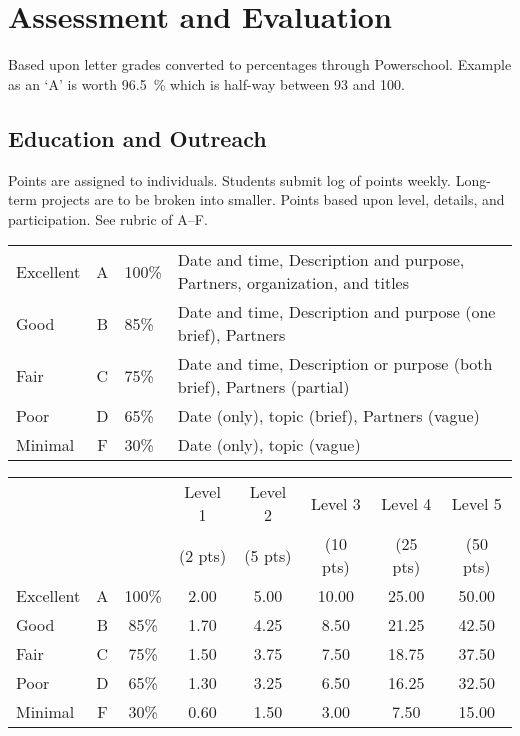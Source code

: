 \documentclass[letterpaper,10pt]{memoir}
\begin{document}
\newpage
\section*{Assessment and Evaluation}

Based upon letter grades converted to percentages through Powerschool. Example as an `A' is worth \SI{96.5}{\percent} which is half-way between 93 and 100.




\subsection*{Education and Outreach}
%
Points are assigned to individuals.
%
Students submit log of points weekly. Long-term projects are to be broken into smaller.
%
Points based upon level, details, and participation. See rubric of A--F.

\vspace*{3mm}


{\renewcommand{\arraystretch}{1.35}
\noindent\begin{tabular}{ l c l p{3in} }

	\midrule

	Excellent & A & 100\% & Date and time, Description and purpose, Partners, organization, and titles \\

	Good & B & 85\% & Date and time, Description and purpose (one brief), Partners \\

	Fair & C & 75\% & Date and time, Description or purpose (both brief), Partners (partial) \\ 

	Poor & D & 65\% & Date (only), topic (brief), Partners (vague) \\

	Minimal & F & 30\% & Date (only), topic (vague) \\
\end{tabular}}

\vspace*{3mm}

\noindent
{\renewcommand{\arraystretch}{1.35}
\begin{tabular}{ l c c c c c c c }
	&&& Level 1 & Level 2 & Level 3 & Level 4 & Level 5 \\[-1mm]
	&&& (2 pts) & (5 pts) & (10 pts) & (25 pts) & (50 pts) \\
	\midrule
	Excellent & A & 100\% & 2.00 &  5.00 & 10.00 & 25.00 & 50.00 \\
	Good      & B &  85\% & 1.70 &  4.25 &  8.50 & 21.25 & 42.50 \\
	Fair      & C &  75\% & 1.50 &  3.75 &  7.50 & 18.75 & 37.50 \\
	Poor      & D &  65\% & 1.30 &  3.25 &  6.50 & 16.25 & 32.50 \\
	Minimal   & F &  30\% & 0.60 &  1.50 &  3.00 &  7.50 & 15.00 \\
\end{tabular}}
\end{document}
